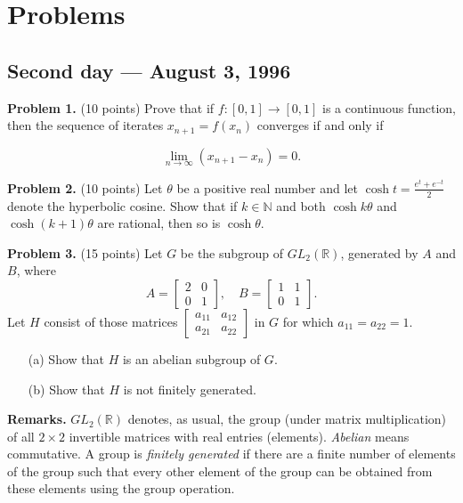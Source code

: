 \documentclass{article}
\begin{document}
\pagestyle{plain}

\section*{Problems}

\subsection*{Second day — August 3, 1996}

\textbf{Problem 1.} (10 points)
Prove that if \( f : [0,1] \to [0,1] \) is a continuous function, then the sequence of iterates \( x_{n+1} = f(x_n) \) converges if and only if

\[
\lim_{n \to \infty} (x_{n+1} - x_n) = 0.
\]

\textbf{Problem 2.} (10 points)
Let \(\theta\) be a positive real number and let \(\cosh t = \frac{e^t + e^{-t}}{2}\) denote the hyperbolic cosine. Show that if \(k \in \mathbb{N}\) and both \(\cosh k\theta\) and \(\cosh (k + 1)\theta\) are rational, then so is \(\cosh \theta\).

\textbf{Problem 3.} (15 points)
Let \( G \) be the subgroup of \( GL_2(\mathbb{R}) \), generated by \( A \) and \( B \), where
\[
A = \begin{bmatrix}
2 & 0 \\
0 & 1
\end{bmatrix}, \quad B = \begin{bmatrix}
1 & 1 \\
0 & 1
\end{bmatrix}.
\]
Let \( H \) consist of those matrices \( \begin{bmatrix}
a_{11} & a_{12} \\
a_{21} & a_{22}
\end{bmatrix} \) in \( G \) for which \( a_{11}=a_{22}=1 \).

\begin{itemize}
    \item[(a)] Show that \( H \) is an abelian subgroup of \( G \).
    \item[(b)] Show that \( H \) is not finitely generated.
\end{itemize}

\textbf{Remarks.} \( GL_2(\mathbb{R}) \) denotes, as usual, the group (under matrix multiplication) of all \( 2 \times 2 \) invertible matrices with real entries (elements). \textit{Abelian} means commutative. A group is \textit{finitely generated} if there are a finite number of elements of the group such that every other element of the group can be obtained from these elements using the group operation.
\end{document}
